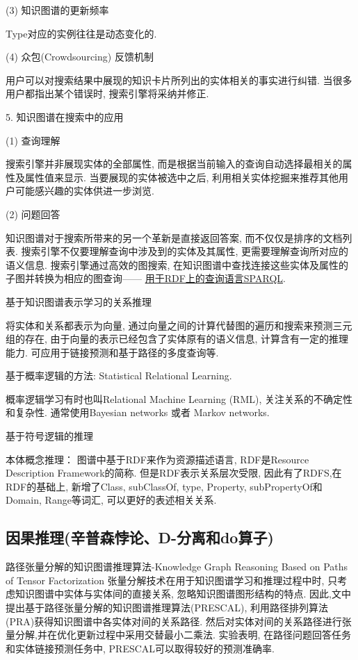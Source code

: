 (3) 知识图谱的更新频率

Type对应的实例往往是动态变化的.

(4) 众包(Crowdsourcing) 反馈机制

用户可以对搜索结果中展现的知识卡片所列出的实体相关的事实进行纠错. 当很多用户都指出某个错误时, 搜索引擎将采纳并修正.

5. 知识图谱在搜索中的应用

(1) 查询理解

搜索引擎并非展现实体的全部属性, 而是根据当前输入的查询自动选择最相关的属性及属性值来显示. 当要展现的实体被选中之后, 利用相关实体挖掘来推荐其他用户可能感兴趣的实体供进一步浏览.

(2)  问题回答

知识图谱对于搜索所带来的另一个革新是直接返回答案, 而不仅仅是排序的文档列表.
搜索引擎不仅要理解查询中涉及到的实体及其属性, 更需要理解查询所对应的语义信息. 搜索引擎通过高效的图搜索, 在知识图谱中查找连接这些实体及属性的子图并转换为相应的图查询——
\href{https://www.w3.org/TR/rdf-sparql-query/}{用于RDF上的查询语言SPARQL}.

 基于知识图谱表示学习的关系推理

将实体和关系都表示为向量, 通过向量之间的计算代替图的遍历和搜索来预测三元组的存在, 由于向量的表示已经包含了实体原有的语义信息, 计算含有一定的推理能⼒. 可应用于链接预测和基于路径的多度查询等.

 基于概率逻辑的方法: Statistical Relational Learning.

概率逻辑学习有时也叫Relational Machine Learning (RML), 关注关系的不确定性和复杂性.
通常使用Bayesian networks 或者 Markov networks.

 基于符号逻辑的推理

本体概念推理： 图谱中基于RDF来作为资源描述语言, RDF是Resource Description Framework的简称.
但是RDF表示关系层次受限, 因此有了RDFS,在RDF的基础上, 新增了Class, subClassOf, type, Property, subPropertyOf和Domain, Range等词汇, 可以更好的表述相关关系.
\subsection{因果推理(辛普森悖论、D-分离和do算子)}

路径张量分解的知识图谱推理算法-Knowledge Graph Reasoning Based on Paths of Tensor Factorization
张量分解技术在用于知识图谱学习和推理过程中时, 只考虑知识图谱中实体与实体间的直接关系, 忽略知识图谱图形结构的特点.
因此,文中提出基于路径张量分解的知识图谱推理算法(PRESCAL), 利用路径排列算法(PRA)获得知识图谱中各实体对间的关系路径.
然后对实体对间的关系路径进行张量分解,并在优化更新过程中采用交替最小二乘法.
实验表明, 在路径问题回答任务和实体链接预测任务中, PRESCAL可以取得较好的预测准确率.
